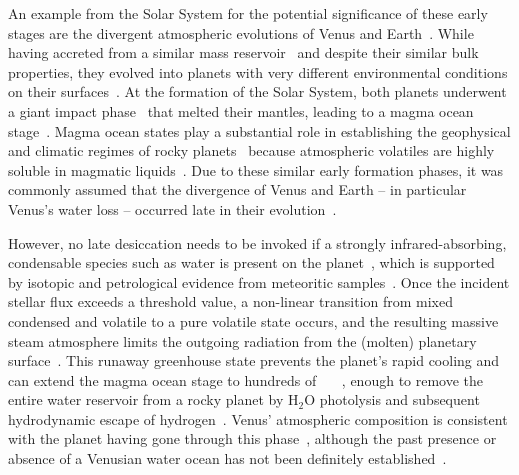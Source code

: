 \documentclass[twocolumn,twocolappendix]{aastex631}
\begin{document}
An example from the Solar System for the potential significance of these early stages are the divergent atmospheric evolutions of Venus and Earth~\citep{2019JGRE..124.2015K,2021JGRE..12606643K}.
While having accreted from a similar mass reservoir~\citep{2020plas.book..287R,2020SSRv..216...55K,2020SSRv..216...27M,2020plas.book....3Z} and despite their similar bulk properties, they evolved into planets with very different environmental conditions on their surfaces~\citep{1982Sci...216..630D,Kasting1988,Hamano2013,Kane2014,2020JGRE..12506276W,Turbet2021}.
At the formation of the Solar System, both planets underwent a giant impact phase~\citep{2020plas.book..287R,2020NatGe..13..265G,Liu2022} that melted their mantles, leading to a magma ocean stage~\citep{2012AREPS..40..113E,2018RSPTA.37680109S,2022arXiv220310023L}.
Magma ocean states play a substantial role in establishing the geophysical and climatic regimes of rocky planets~\citep{2020ChEG...80l5594F} because atmospheric volatiles are highly soluble in magmatic liquids~\citep{2021ApJ...909L..22K,Dorn2021}.
Due to these similar early formation phases, it was commonly assumed that the divergence of Venus and Earth -- in particular Venus's water loss -- occurred late in their evolution~\citep{Elkins-Tanton2013}.

However, no late desiccation needs to be invoked if a strongly infrared-absorbing, condensable species such as water is present on the planet~\citep{Hamano2013}, which is supported by isotopic and petrological evidence from meteoritic samples~\citep{2018SSRv..214...36A,2022Natur.611..245B}.
Once the incident stellar flux exceeds a threshold value, a non-linear transition from mixed condensed and volatile to a pure volatile state occurs, and the resulting massive steam atmosphere limits the outgoing radiation from the (molten) planetary surface~\citep{Ingersoll1969,Kasting1988,2010ppc..book.....P,Goldblatt2013,2015ExA....40..449L,2017JGRE..122.1458S}.
This runaway greenhouse state prevents the planet's rapid cooling and can extend the magma ocean stage to hundreds of \SI{}{\mega\year}~\citep{2016ApJ...829...63S,2021AsBio..21.1325B}, enough to remove the entire water reservoir from a rocky planet by H$_2$O photolysis and subsequent hydrodynamic escape of hydrogen~\citep{2013ApJ...778..154W,2014ApJ...785L..20W,Luger2015}.
Venus' atmospheric composition is consistent with the planet having gone through this phase~\citep{2020NatGe..13..265G}, although the past presence or absence of a Venusian water ocean has not been definitely established~\citep{Raymond2006,Raymond2007,Hamano2013,Way2016,2019JGRE..124.2015K,2021JGRE..12606643K,Turbet2021,2023PNAS..12009751W}.
\end{document}
